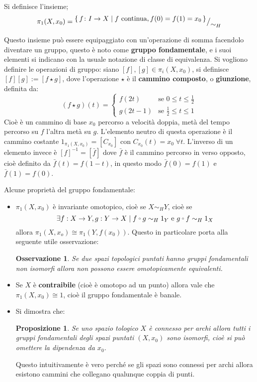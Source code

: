 \documentclass[10pt, twoside=false, x11names]{scrbook}
\newtheorem{proposition}[theorem]{Proposizione}
\newtheorem{osservation}[theorem]{Osservazione}
\newcommand{\vedi}[1]{\emph{vedi} #1}
\newcommand*\quot[2]{{^{\textstyle #1}\big/_{\textstyle #2}}}
\let\latexcirc=\circ
\newcommand{\ccirc}{\mathbin{\mathchoice
  {\xcirc\scriptstyle}
  {\xcirc\scriptstyle}
  {\xcirc\scriptscriptstyle}
  {\xcirc\scriptscriptstyle}
}}
\newcommand{\xcirc}[1]{\vcenter{\hbox{$#1\latexcirc$}}}
\let\circ\ccirc
\begin{document}
Si definisce l'insieme;
\[
  \pi_1(X,x_0) = \quot{\set{f \colon I \to X | f \text{ continua}, f(0) = f(1) = x_0}}{\sim_H}
\]

Questo insieme può essere equipaggiato con un'operazione di somma facendolo diventare un gruppo,
questo è noto come \textbf{gruppo fondamentale}, e i suoi elementi
si indicano con la usuale notazione di classe di equivalenza.
Si vogliono definire le operazioni di gruppo:
siano $ [f], [g] \in \pi_i(X,x_0) $, si definisce $ [f][g] := [f \star g] $, dove l'operazione $ \star $ è
il \textbf{cammino composto}, o \textbf{giunzione}, 
\index{Giunzione!\vedi{Cammino composto}} definita da:
\[
  (f \star g)(t) =
  \begin{cases}
    f(2t) & \text{se } 0 \leq t \leq \frac{1}{2} \\
    g(2t -1) & \text{se } \frac{1}{2} \leq t \leq 1
  \end{cases}
\]
Cioè è un cammino di base $ x_0 $ percorso a velocità doppia, metà del tempo
percorso su $ f $ l'altra metà su $ g $.
L'elemento neutro di questa operazione è il cammino costante $ 1_{\pi_1(X,x_0)} = [C_{x_0}] $ con
$ C_{x_0}(t) = x_0 \; \forall t $.
L'inverso di un elemento invece è $ [f]^{-1} = [\bar{f}] $ dove $ \bar{f} $ è il
cammino percorso in verso opposto, cioè definito da $ \bar{f}(t) = f(1-t) $, in
questo modo $ \bar{f}(0) = f(1) $ e $ \bar{f}(1) = f(0) $.

Alcune proprietà del gruppo fondamentale:
\begin{itemize}
\item $ \pi_1(X,x_0) $ è invariante omotopico, cioè se $ X \sim_H Y $, cioè se
  \[
    \exists f: X \to Y, g: Y \to X \; | \; f \circ g \sim_H 1_Y \text{ e }  g \circ f \sim_H 1_X
  \]
  allora $ \pi_1(X,x_o) \cong \pi_1(Y,f(x_0)) $. Questo in particolare porta alla seguente
  utile osservazione:
  \begin{osservation}
    Se due spazi topologici puntati hanno gruppi fondamentali non isomorfi allora
    non possono essere omotopicamente equivalenti.
  \end{osservation}
\item Se $ X $ è \textbf{contraibile} (cioè è
  omotopo ad un punto) allora vale che $ \pi_1(X,x_0) \cong 1 $, cioè il gruppo
  fondamentale è banale.
\item Si dimostra che:
  \begin{proposition}
    Se uno spazio tologico $ X $ è connesso per archi allora tutti i gruppi fondamentali
    degli spazi puntati $ (X,x_0) $ sono isomorfi, cioè si può omettere la dipendenza da $ x_0 $.
  \end{proposition}
  Questo intuitivamente è vero perché se gli spazi sono connessi per archi allora esistono cammini
  che collegano qualunque coppia di punti.
\end{itemize}
\end{document}
